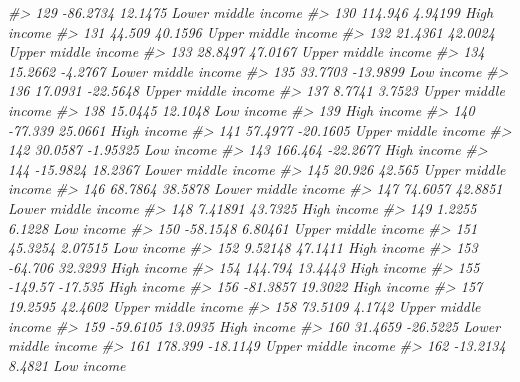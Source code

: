 \documentclass[
  xelatex, ja=standard]{bxjsbook}
\newenvironment{Shaded}{\begin{snugshade}}{\end{snugshade}}
\newcommand{\CommentTok}[1]{\textcolor[rgb]{0.56,0.35,0.01}{\textit{#1}}}
\theoremstyle{definition}
\theoremstyle{definition}
\theoremstyle{definition}
\theoremstyle{definition}
\theoremstyle{remark}
\begin{document}
\begin{Shaded}
\begin{Highlighting}[]
\CommentTok{\#\textgreater{} 129   {-}86.2734    12.1475 Lower middle income}
\CommentTok{\#\textgreater{} 130    114.946    4.94199         High income}
\CommentTok{\#\textgreater{} 131     44.509    40.1596 Upper middle income}
\CommentTok{\#\textgreater{} 132    21.4361    42.0024 Upper middle income}
\CommentTok{\#\textgreater{} 133    28.8497    47.0167 Upper middle income}
\CommentTok{\#\textgreater{} 134    15.2662    {-}4.2767 Lower middle income}
\CommentTok{\#\textgreater{} 135    33.7703   {-}13.9899          Low income}
\CommentTok{\#\textgreater{} 136    17.0931   {-}22.5648 Upper middle income}
\CommentTok{\#\textgreater{} 137     8.7741     3.7523 Upper middle income}
\CommentTok{\#\textgreater{} 138    15.0445    12.1048          Low income}
\CommentTok{\#\textgreater{} 139                               High income}
\CommentTok{\#\textgreater{} 140    {-}77.339    25.0661         High income}
\CommentTok{\#\textgreater{} 141    57.4977   {-}20.1605 Upper middle income}
\CommentTok{\#\textgreater{} 142    30.0587   {-}1.95325          Low income}
\CommentTok{\#\textgreater{} 143    166.464   {-}22.2677         High income}
\CommentTok{\#\textgreater{} 144   {-}15.9824    18.2367 Lower middle income}
\CommentTok{\#\textgreater{} 145     20.926     42.565 Upper middle income}
\CommentTok{\#\textgreater{} 146    68.7864    38.5878 Lower middle income}
\CommentTok{\#\textgreater{} 147    74.6057    42.8851 Lower middle income}
\CommentTok{\#\textgreater{} 148    7.41891    43.7325         High income}
\CommentTok{\#\textgreater{} 149     1.2255     6.1228          Low income}
\CommentTok{\#\textgreater{} 150   {-}58.1548    6.80461 Upper middle income}
\CommentTok{\#\textgreater{} 151    45.3254    2.07515          Low income}
\CommentTok{\#\textgreater{} 152    9.52148    47.1411         High income}
\CommentTok{\#\textgreater{} 153    {-}64.706    32.3293         High income}
\CommentTok{\#\textgreater{} 154    144.794    13.4443         High income}
\CommentTok{\#\textgreater{} 155    {-}149.57    {-}17.535         High income}
\CommentTok{\#\textgreater{} 156   {-}81.3857    19.3022         High income}
\CommentTok{\#\textgreater{} 157    19.2595    42.4602 Upper middle income}
\CommentTok{\#\textgreater{} 158    73.5109     4.1742 Upper middle income}
\CommentTok{\#\textgreater{} 159   {-}59.6105    13.0935         High income}
\CommentTok{\#\textgreater{} 160    31.4659   {-}26.5225 Lower middle income}
\CommentTok{\#\textgreater{} 161    178.399   {-}18.1149 Upper middle income}
\CommentTok{\#\textgreater{} 162   {-}13.2134     8.4821          Low income}

\end{Highlighting}
\end{Shaded}
\end{document}
